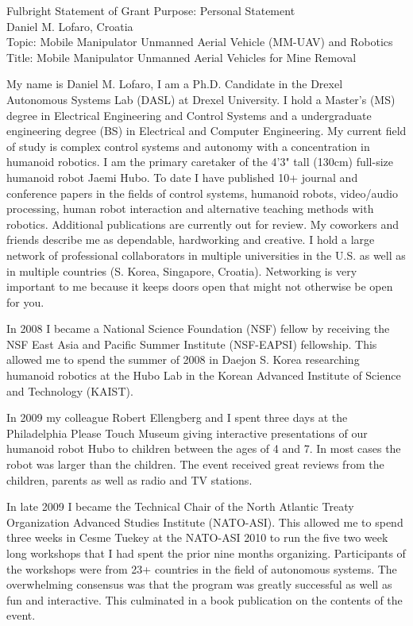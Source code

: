 \documentclass[12pt]{article}
\begin{document}
\begin{center}
\Large
Fulbright Statement of Grant Purpose: Personal Statement\\
\large
Daniel M. Lofaro, Croatia\\
Topic: Mobile Manipulator Unmanned Aerial Vehicle (MM-UAV) and Robotics\\
Title: Mobile Manipulator Unmanned Aerial Vehicles for Mine Removal\\

\end{center}

\normalsize
My name is Daniel M. Lofaro, I am a Ph.D. Candidate in the Drexel Autonomous Systems Lab (DASL) at Drexel University.  I hold a Master's (MS) degree in Electrical Engineering and Control Systems and a undergraduate engineering degree (BS) in Electrical and Computer Engineering.  My current field of study is complex control systems and autonomy with a concentration in humanoid robotics.  I am the primary caretaker of the 4'3" tall (130cm) full-size humanoid robot Jaemi Hubo.  To date I have published 10+ journal and conference papers in the fields of control systems, humanoid robots, video/audio processing, human robot interaction and alternative teaching methods with robotics.  Additional publications are currently out for review.   My coworkers and friends describe me as dependable, hardworking and creative.  I hold a large network of professional collaborators in multiple universities in the U.S. as well as in multiple countries (S. Korea, Singapore, Croatia).  Networking is very important to me because it keeps doors open that might not otherwise be open for you.

In 2008 I became a National Science Foundation (NSF) fellow by receiving the NSF East Asia and Pacific Summer Institute (NSF-EAPSI) fellowship.  This allowed me to spend the summer of 2008 in Daejon S. Korea researching humanoid robotics at the Hubo Lab in the Korean Advanced Institute of Science and Technology (KAIST).

In 2009 my colleague Robert Ellengberg and I spent three days at the Philadelphia Please Touch Museum giving interactive presentations of our humanoid robot Hubo to children between the ages of 4 and 7.  In most cases the robot was larger than the children.  The event received great reviews from the children, parents as well as radio and TV stations.

In late 2009 I became the Technical Chair of the North Atlantic Treaty Organization Advanced Studies Institute (NATO-ASI).  This allowed me to spend three weeks in Cesme Tuekey at the NATO-ASI 2010 to run the five two week long workshops that I had spent the prior nine months organizing.  Participants of the workshops were from 23+ countries in the field of autonomous systems.  The overwhelming consensus was that the program was greatly successful as well as fun and interactive.  This culminated in a book publication on the contents of the event.
\end{document}
